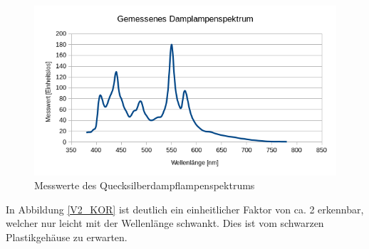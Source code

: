 \begin{figure}[h]
	\centering
	\includegraphics[scale=0.7]{Images/V2_Dampflampe.png}
	\caption{Messwerte des Quecksilberdampflampenspektrums}
	\label{V2_QDL}
\end{figure}

In Abbildung \ref{V2_KOR} ist deutlich ein einheitlicher Faktor von ca. 2 erkennbar, welcher nur leicht mit der Wellenlänge schwankt. Dies ist vom schwarzen Plastikgehäuse zu erwarten.
